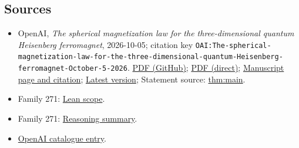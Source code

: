 \documentclass[11pt]{article}
\begin{document}
\subsection{Sources}
\begin{itemize}
\item OpenAI, \emph{The spherical magnetization law for the three-dimensional quantum Heisenberg ferromagnet}, 2026-10-05; citation key \texttt{OAI:The-spherical-magnetization-law-for-the-three-dimensional-quantum-Heisenberg-ferromagnet-October-5-2026}. \href{https://github.com/openai/math/blob/adc7f1241b42e322a6451854ab7e4b4c146bf78a/preprints/The-spherical-magnetization-law-for-the-three-dimensional-quantum-Heisenberg-ferromagnet-October-5-2026/spherical-magnetization.pdf}{PDF (GitHub)}; \href{https://github.com/openai/math/raw/adc7f1241b42e322a6451854ab7e4b4c146bf78a/preprints/The-spherical-magnetization-law-for-the-three-dimensional-quantum-Heisenberg-ferromagnet-October-5-2026/spherical-magnetization.pdf}{PDF (direct)}; \href{https://github.com/openai/math/blob/adc7f1241b42e322a6451854ab7e4b4c146bf78a/preprints/The-spherical-magnetization-law-for-the-three-dimensional-quantum-Heisenberg-ferromagnet-October-5-2026/README.md}{Manuscript page and citation}; \href{https://github.com/openai/math/blob/main/preprints/The-spherical-magnetization-law-for-the-three-dimensional-quantum-Heisenberg-ferromagnet-October-5-2026/spherical-magnetization.pdf}{Latest version}; Statement source: \href{https://github.com/openai/math/blob/adc7f1241b42e322a6451854ab7e4b4c146bf78a/preprints/The-spherical-magnetization-law-for-the-three-dimensional-quantum-Heisenberg-ferromagnet-October-5-2026/build/sections/01-introduction.tex\#L45}{thm:main}.
\item Family 271: \href{https://github.com/openai/math/blob/adc7f1241b42e322a6451854ab7e4b4c146bf78a/lean/docs/271.md}{Lean scope}.
\item Family 271: \href{https://github.com/openai/math/blob/adc7f1241b42e322a6451854ab7e4b4c146bf78a/reasoning\_traces/spontaneous-magnetization-quantum-heisenberg-ferromagnet.pdf}{Reasoning summary}.
\item \href{https://github.com/openai/math/blob/adc7f1241b42e322a6451854ab7e4b4c146bf78a/CONTENTS.md}{OpenAI catalogue entry}.
\end{itemize}
\end{document}
